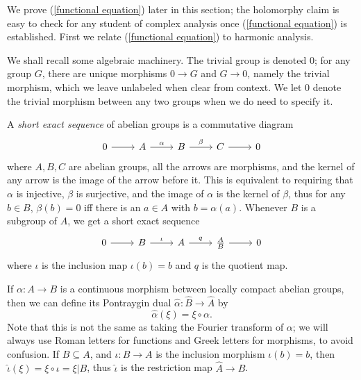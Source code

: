 \documentclass[12pt]{book}
\newcommand{\dfn}[1]{\emph{#1}\index{#1}}
\theoremstyle{definition}
\begin{document}
We prove (\ref{functional equation}) later in this section; the holomorphy claim is easy to check for any student of complex analysis once (\ref{functional equation}) is established.
First we relate (\ref{functional equation}) to harmonic analysis.

We shall recall some algebraic machinery.
The trivial group is denoted $0$; for any group $G$, there are unique morphisms $0 \to G$ and $G \to 0$, namely the trivial morphism, which we leave unlabeled when clear from context.
We let $0$ denote the trivial morphism between any two groups when we do need to specify it.

A \dfn{short exact sequence} of abelian groups is a commutative diagram
$$\begin{tikzcd}
0 \arrow[r] & A \arrow[r,"\alpha"] & B \arrow[r,"\beta"] & C \arrow[r] & 0
\end{tikzcd}$$
where $A,B,C$ are abelian groups, all the arrows are morphisms, and the kernel of any arrow is the image of the arrow before it.
This is equivalent to requiring that $\alpha$ is injective, $\beta$ is surjective, and the image of $\alpha$ is the kernel of $\beta$, thus for any $b \in B$, $\beta(b) = 0$ iff there is an $a \in A$ with $b = \alpha(a)$.
Whenever $B$ is a subgroup of $A$, we get a short exact sequence
\begin{equation}
\label{quotient SES}
\begin{tikzcd}
0 \arrow[r] & B \arrow[r,"\iota"] & A \arrow[r,"q"] & \frac{A}{B} \arrow[r] & 0
\end{tikzcd}
\end{equation}
where $\iota$ is the inclusion map $\iota(b) =b$ and $q$ is the quotient map.

If $\alpha: A \to B$ is a continuous morphism between locally compact abelian groups, then we can define its Pontraygin dual $\hat \alpha: \hat B \to \hat A$ by
$$\hat \alpha(\xi) = \xi \circ \alpha.$$
Note that this is not the same as taking the Fourier transform of $\alpha$; we will always use Roman letters for functions and Greek letters for morphisms, to avoid confusion.
If $B \subseteq A$, and $\iota: B \to A$ is the inclusion morphism $\iota(b) = b$, then $\hat \iota(\xi) = \xi \circ \iota = \xi|B$, thus $\hat \iota$ is the restriction map $\hat A \to \hat B$.
\end{document}
